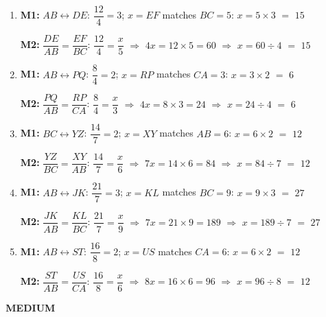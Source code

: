 \documentclass[11pt]{article}
\newcommand{\ans}[1]{\textcolor{fmans}{\textbf{#1}}}
\newcommand{\leveltag}[2]{\colorbox{#1}{\color{white}\bfseries\small\,#2\,}}
\begin{document}
\begin{enumerate}[label=\textbf{\arabic*.},start=6,itemsep=2mm,leftmargin=*]
\item \textbf{M1:} $AB \leftrightarrow DE$: \;$\dfrac{12}{4} = 3$; \; $x = EF$ matches $BC = 5$: \;$x = 5 \times 3$ $=$ \ans{$15$}\par\textbf{M2:} $\dfrac{DE}{AB} = \dfrac{EF}{BC}$: \; $\dfrac{12}{4} = \dfrac{x}{5}$ \;$\Rightarrow$\; $4x = 12 \times 5 = 60$ \;$\Rightarrow$\; $x = 60 \div 4$ $=$ \ans{$15$}
\item \textbf{M1:} $AB \leftrightarrow PQ$: \;$\dfrac{8}{4} = 2$; \; $x = RP$ matches $CA = 3$: \;$x = 3 \times 2$ $=$ \ans{$6$}\par\textbf{M2:} $\dfrac{PQ}{AB} = \dfrac{RP}{CA}$: \; $\dfrac{8}{4} = \dfrac{x}{3}$ \;$\Rightarrow$\; $4x = 8 \times 3 = 24$ \;$\Rightarrow$\; $x = 24 \div 4$ $=$ \ans{$6$}
\item \textbf{M1:} $BC \leftrightarrow YZ$: \;$\dfrac{14}{7} = 2$; \; $x = XY$ matches $AB = 6$: \;$x = 6 \times 2$ $=$ \ans{$12$}\par\textbf{M2:} $\dfrac{YZ}{BC} = \dfrac{XY}{AB}$: \; $\dfrac{14}{7} = \dfrac{x}{6}$ \;$\Rightarrow$\; $7x = 14 \times 6 = 84$ \;$\Rightarrow$\; $x = 84 \div 7$ $=$ \ans{$12$}
\item \textbf{M1:} $AB \leftrightarrow JK$: \;$\dfrac{21}{7} = 3$; \; $x = KL$ matches $BC = 9$: \;$x = 9 \times 3$ $=$ \ans{$27$}\par\textbf{M2:} $\dfrac{JK}{AB} = \dfrac{KL}{BC}$: \; $\dfrac{21}{7} = \dfrac{x}{9}$ \;$\Rightarrow$\; $7x = 21 \times 9 = 189$ \;$\Rightarrow$\; $x = 189 \div 7$ $=$ \ans{$27$}
\item \textbf{M1:} $AB \leftrightarrow ST$: \;$\dfrac{16}{8} = 2$; \; $x = US$ matches $CA = 6$: \;$x = 6 \times 2$ $=$ \ans{$12$}\par\textbf{M2:} $\dfrac{ST}{AB} = \dfrac{US}{CA}$: \; $\dfrac{16}{8} = \dfrac{x}{6}$ \;$\Rightarrow$\; $8x = 16 \times 6 = 96$ \;$\Rightarrow$\; $x = 96 \div 8$ $=$ \ans{$12$}
\end{enumerate}
\needspace{4cm}\leveltag{fmturn}{MEDIUM}\par\vspace{1mm}
\end{document}
